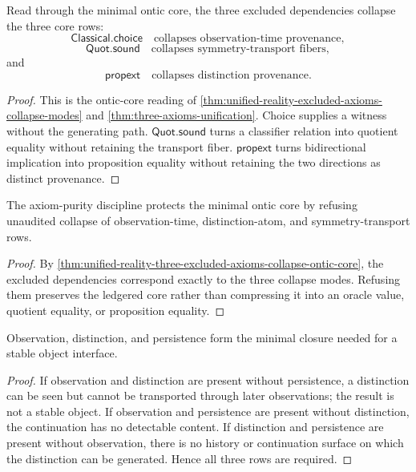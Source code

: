 \begin{theorem}
\label{thm:unified-reality-three-excluded-axioms-collapse-ontic-core}
Read through the minimal ontic core, the three excluded dependencies
collapse the three core rows:
$$
\mathsf{Classical.choice}
\quad\text{collapses observation-time provenance},
$$
$$
\mathsf{Quot.sound}
\quad\text{collapses symmetry-transport fibers},
$$
and
$$
\mathsf{propext}
\quad\text{collapses distinction provenance}.
$$
\end{theorem}

\begin{proof}
This is the ontic-core reading of
\autoref{thm:unified-reality-excluded-axioms-collapse-modes} and
\autoref{thm:three-axioms-unification}. Choice supplies a witness
without the generating path. $\mathsf{Quot.sound}$ turns a classifier
relation into quotient equality without retaining the transport fiber.
$\mathsf{propext}$ turns bidirectional implication into proposition
equality without retaining the two directions as distinct provenance.
\end{proof}

\begin{corollary}
\label{cor:unified-reality-axiom-purity-protects-ontic-core}
The axiom-purity discipline protects the minimal ontic core by refusing
unaudited collapse of observation-time, distinction-atom, and
symmetry-transport rows.
\end{corollary}

\begin{proof}
By
\autoref{thm:unified-reality-three-excluded-axioms-collapse-ontic-core},
the excluded dependencies correspond exactly to the three collapse
modes. Refusing them preserves the ledgered core rather than compressing
it into an oracle value, quotient equality, or proposition equality.
\end{proof}

\begin{theorem}
\label{thm:unified-reality-minimal-closure-ontic-core}
Observation, distinction, and persistence form the minimal closure
needed for a stable object interface.
\end{theorem}

\begin{proof}
If observation and distinction are present without persistence, a
distinction can be seen but cannot be transported through later
observations; the result is not a stable object. If observation and
persistence are present without distinction, the continuation has no
detectable content. If distinction and persistence are present without
observation, there is no history or continuation surface on which the
distinction can be generated. Hence all three rows are required.
\end{proof}

